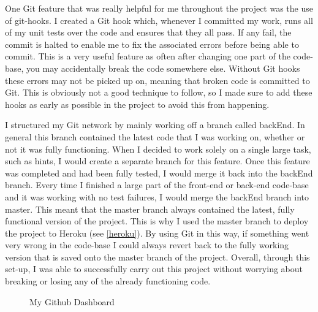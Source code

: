 One Git feature that was really helpful for me throughout the project was the use of git-hooks. I created a Git hook which, whenever I committed my work, runs all of my unit tests over the code and ensures that they all pass. If any fail, the commit is halted to enable me to fix the associated errors before being able to commit. This is a very useful feature as often after changing one part of the code-base, you may accidentally break the code somewhere else. Without Git hooks these errors may not be picked up on, meaning that broken code is committed to Git.  This is obviously not a good technique to follow, so I made sure to add these hooks as early as possible in the project to avoid this from happening.

I structured my Git network by mainly working off a branch called backEnd. In general this branch contained the latest code that I was working on, whether or not it was fully functioning. When I decided to work solely on a single large task, such as hints, I would create a separate branch for this feature. Once this feature was completed and had been fully tested, I would merge it back into the backEnd branch. Every time I finished a large part of the front-end or back-end code-base and it was working with no test failures, I would merge the backEnd branch into master. This meant that the master branch always contained the latest, fully functional version of the project. This is why I used the master branch to deploy the project to Heroku (see \ref{heroku}). By using Git in this way,  if something went very wrong in the code-base I could always revert back to the fully working version that is saved onto the master branch of the project. Overall, through this set-up, I was able to successfully carry out this project without worrying about breaking or losing any of the already functioning code.


\begin{figure}[!ht]
	\centering
	\caption{My Github Dashboard}
\end{figure}

